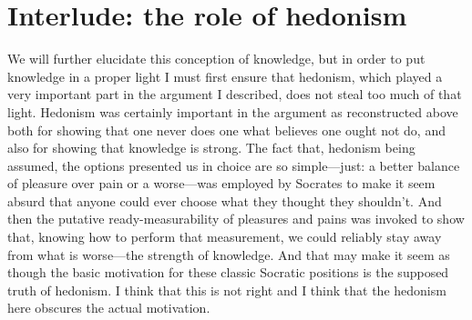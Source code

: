 \documentclass[11pt]{amsart}
\begin{document}
\section{Interlude: the role of hedonism}

We will further elucidate this conception of knowledge, but in order to put knowledge in a proper light I must first ensure that hedonism, which played a very important part in the argument I described, does not steal too much of that light. Hedonism was certainly important in the argument as reconstructed above both for showing that one never does one what believes one ought not do, and also for showing that knowledge is strong. The fact that, hedonism being assumed, the options presented us in choice are so simple---just: a better balance of pleasure over pain or a worse---was employed by Socrates to make it seem absurd that anyone could ever choose what they thought they shouldn't. And then the putative ready-measurability of pleasures and pains was invoked to show that, knowing how to perform that measurement, we could reliably stay away from what is worse---the strength of knowledge. And that may make it seem as though the basic motivation for these classic Socratic positions is the supposed truth of hedonism. I think that this is not right and I think that the hedonism here obscures the actual motivation.

\end{document}
